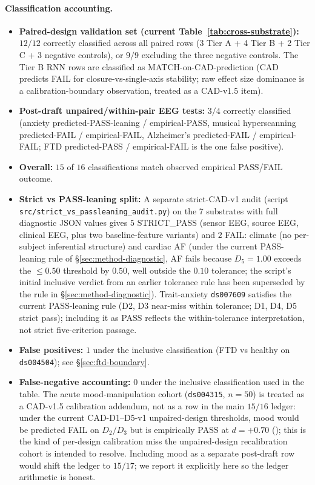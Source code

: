 \documentclass[11pt,a4paper]{article}
\begin{document}
\paragraph{Classification accounting.}
\begin{itemize}\itemsep0pt
\item \textbf{Paired-design validation set (current Table~\ref{tab:cross-substrate}):} $12/12$ correctly classified across all paired rows (3 Tier A + 4 Tier B + 2 Tier C + 3 negative controls), or $9/9$ excluding the three negative controls. The Tier B RNN rows are classified as MATCH-on-CAD-prediction (CAD predicts FAIL for closure-vs-single-axis stability; raw effect size dominance is a calibration-boundary observation, treated as a CAD-v1.5 item).
\item \textbf{Post-draft unpaired/within-pair EEG tests:} $3/4$ correctly classified (anxiety predicted-PASS-leaning / empirical-PASS, musical hyperscanning predicted-FAIL / empirical-FAIL, Alzheimer's predicted-FAIL / empirical-FAIL; FTD predicted-PASS / empirical-FAIL is the one false positive).
\item \textbf{Overall:} $15$ of $16$ classifications match observed empirical PASS/FAIL outcome.
\item \textbf{Strict vs PASS-leaning split:} A separate strict-CAD-v1 audit (script \texttt{src/strict\_vs\_passleaning\_audit.py}) on the 7 substrates with full diagnostic JSON values gives $5$ STRICT\_PASS (sensor EEG, source EEG, clinical EEG, plus two baseline-feature variants) and $2$ FAIL: climate (no per-subject inferential structure) and cardiac AF (under the current PASS-leaning rule of \S\ref{sec:method-diagnostic}, AF fails because $D_5 = 1.00$ exceeds the $\leq 0.50$ threshold by $0.50$, well outside the $0.10$ tolerance; the script's initial inclusive verdict from an earlier tolerance rule has been superseded by the rule in \S\ref{sec:method-diagnostic}). Trait-anxiety \texttt{ds007609} satisfies the current PASS-leaning rule (D2, D3 near-miss within tolerance; D1, D4, D5 strict pass); including it as PASS reflects the within-tolerance interpretation, not strict five-criterion passage.
\item \textbf{False positives:} $1$ under the inclusive classification (FTD vs healthy on \texttt{ds004504}); see \S\ref{sec:ftd-boundary}.
\item \textbf{False-negative accounting:} $0$ under the inclusive classification used in the table. The acute mood-manipulation cohort (\texttt{ds004315}, $n = 50$) is treated as a CAD-v1.5 calibration addendum, not as a row in the main $15/16$ ledger: under the current CAD-D1--D5-v1 unpaired-design thresholds, mood would be predicted FAIL on $D_2/D_3$ but is empirically PASS at $d = +0.70$ (\citet{SolutionLab005}); this is the kind of per-design calibration miss the unpaired-design recalibration cohort is intended to resolve. Including mood as a separate post-draft row would shift the ledger to $15/17$; we report it explicitly here so the ledger arithmetic is honest.

\end{itemize}
\end{document}
